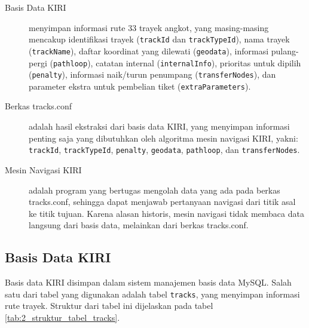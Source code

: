 \begin{description}
	\item[Basis Data KIRI] menyimpan informasi rute 33 trayek angkot, yang masing-masing mencakup identifikasi trayek (\texttt{trackId} dan \texttt{trackTypeId}), nama trayek (\texttt{trackName}), daftar koordinat yang dilewati (\texttt{geodata}), informasi pulang-pergi (\texttt{pathloop}), catatan internal (\texttt{internalInfo}), prioritas untuk dipilih (\texttt{penalty}), informasi naik/turun penumpang (\texttt{transferNodes}), dan parameter ekstra untuk pembelian tiket (\texttt{extraParameters}).
	\item[Berkas tracks.conf] adalah hasil ekstraksi dari basis data KIRI, yang menyimpan informasi penting saja yang dibutuhkan oleh algoritma mesin navigasi KIRI, yakni: \texttt{trackId}, \texttt{trackTypeId}, \texttt{penalty}, \texttt{geodata}, \texttt{pathloop}, dan \texttt{transferNodes}.
	\item[Mesin Navigasi KIRI] adalah program yang bertugas mengolah data yang ada pada berkas tracks.conf, sehingga dapat menjawab pertanyaan navigasi dari titik asal ke titik tujuan. Karena alasan historis, mesin navigasi tidak membaca data langsung dari basis data, melainkan dari berkas tracks.conf.
\end{description}

\subsection{Basis Data KIRI}
Basis data KIRI disimpan dalam sistem manajemen basis data MySQL. Salah satu dari tabel yang digunakan adalah tabel \texttt{tracks}, yang menyimpan informasi rute trayek. Struktur dari tabel ini dijelaskan pada tabel \ref{tab:2_struktur_tabel_tracks}.

